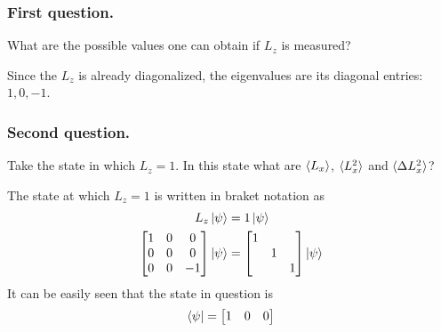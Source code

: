 \documentclass[../../../main.tex]{subfiles}
\begin{document}
\subsubsection{First question.}
What are the possible values one can obtain if $L_z$ is measured?

Since the $L_z$ is already diagonalized, the eigenvalues are its diagonal entries: $1,0,-1$.

\subsubsection{Second question.}
Take the state in which $L_z=1$.
In this state what are $\braket{L_x}$, $\braket{L_x^2}$ and $\braket{\Delta L_x^2}$?

The state at which $L_z=1$ is written in braket notation as
\begin{align*}
    L_z \ket{\psi} & =  1 \ket{\psi} \\
    \begin{bmatrix}
                            1 & 0 & 0  \\
                            0 & 0 & 0  \\
                            0 & 0 & -1 \\
                        \end{bmatrix}
    \ket{\psi}     & =
    \begin{bmatrix}
        1 &   &   \\
          & 1 &   \\
          &   & 1 \\
    \end{bmatrix}
    \ket{\psi}
\end{align*}
It can be easily seen that the state in question is
\begin{align*}
    \bra{\psi}=\begin{bmatrix}
                   1 & 0 & 0
               \end{bmatrix}
\end{align*}
\end{document}
